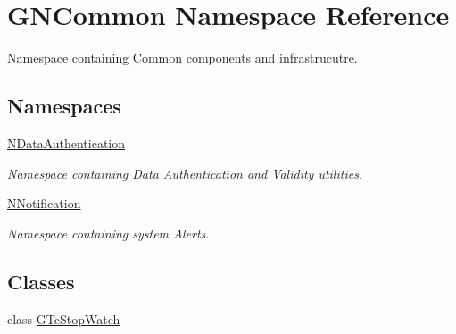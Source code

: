 \hypertarget{namespace_g_n_common}{}\section{G\+N\+Common Namespace Reference}
\label{namespace_g_n_common}


Namespace containing Common components and infrastrucutre.  


\subsection*{Namespaces}
\begin{DoxyCompactItemize}
\item 
 \mbox{\hyperlink{namespace_g_n_common_1_1_n_data_authentication}{N\+Data\+Authentication}}
\begin{DoxyCompactList}\small\item\em Namespace containing Data Authentication and Validity utilities. \end{DoxyCompactList}\item 
 \mbox{\hyperlink{namespace_g_n_common_1_1_n_notification}{N\+Notification}}
\begin{DoxyCompactList}\small\item\em Namespace containing system Alerts. \end{DoxyCompactList}\end{DoxyCompactItemize}
\subsection*{Classes}
\begin{DoxyCompactItemize}
\item 
class \mbox{\hyperlink{class_g_n_common_1_1_g_tc_stop_watch}{G\+Tc\+Stop\+Watch}}
\end{DoxyCompactItemize}
